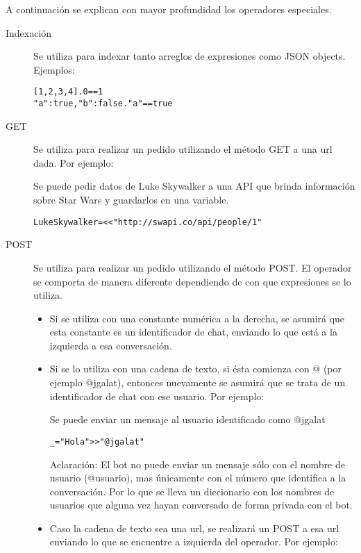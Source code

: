\documentclass[12pt,a4paper,final]{article}
\begin{document}
A continuación se explican con mayor profundidad los operadores especiales.

\begin{description}
\item [Indexación] Se utiliza para indexar tanto arreglos de expresiones como JSON objects. Ejemplos:
\begin{alltt}
[1,2,3,4] . 0 == 1
{\textbraceleft} "a" : true, "b" : false \textbraceright . "a" == true
\end{alltt}

\item [GET] Se utiliza para realizar un pedido utilizando el método GET a una url dada. Por ejemplo:

Se puede pedir datos de Luke Skywalker a una API que brinda información sobre Star Wars y guardarlos en una variable.
\begin{alltt}
LukeSkywalker = << "http://swapi.co/api/people/1"
\end{alltt}

\item [POST] Se utiliza para realizar un pedido utilizando el método POST. El operador se comporta de manera diferente dependiendo de con que expresiones se lo utiliza.

\begin{itemize}
\item Si se utiliza con una constante numérica a la derecha, se asumirá que esta constante es un identificador de chat, enviando lo que está a la izquierda a esa conversación.

\item Si se lo utiliza con una cadena de texto, si ésta comienza con @ (por ejemplo @jgalat), entonces nuevamente se asumirá que se trata de un identificador de chat con ese usuario. Por ejemplo:

Se puede enviar un mensaje al usuario identificado como @jgalat
\begin{alltt}
_ = "Hola" >> "@jgalat"
\end{alltt}

Aclaración: El bot no puede enviar un mensaje sólo con el nombre de usuario (@usuario), mas únicamente con el número que identifica a la conversación. Por lo que se lleva un diccionario con los nombres de usuarios que alguna vez hayan conversado de forma privada con el bot.

\item Caso la cadena de texto sea una url, se realizará un POST a esa url enviando lo que se encuentre a izquierda del operador. Por ejemplo:


\end{itemize}
\end{description}
\end{document}
